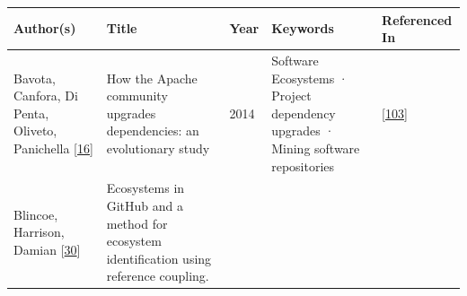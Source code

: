 \documentclass[]{book}
\begin{document}
\begin{longtable}[]{@{}lllll@{}}
\toprule
\begin{minipage}[b]{0.12\columnwidth}\raggedright\strut
Author(s)\strut
\end{minipage} & \begin{minipage}[b]{0.31\columnwidth}\raggedright\strut
Title\strut
\end{minipage} & \begin{minipage}[b]{0.02\columnwidth}\raggedright\strut
Year\strut
\end{minipage} & \begin{minipage}[b]{0.24\columnwidth}\raggedright\strut
Keywords\strut
\end{minipage} & \begin{minipage}[b]{0.16\columnwidth}\raggedright\strut
Referenced In\strut
\end{minipage}\tabularnewline
\midrule
\endhead
\begin{minipage}[t]{0.12\columnwidth}\raggedright\strut
Bavota, Canfora, Di Penta, Oliveto, Panichella
{[}\protect\hyperlink{ref-Bavota2014}{16}{]}\strut
\end{minipage} & \begin{minipage}[t]{0.31\columnwidth}\raggedright\strut
How the Apache community upgrades dependencies: an evolutionary
study\strut
\end{minipage} & \begin{minipage}[t]{0.02\columnwidth}\raggedright\strut
2014\strut
\end{minipage} & \begin{minipage}[t]{0.24\columnwidth}\raggedright\strut
Software Ecosystems · Project dependency upgrades · Mining software
repositories\strut
\end{minipage} & \begin{minipage}[t]{0.16\columnwidth}\raggedright\strut
{[}\protect\hyperlink{ref-Kula2017}{103}{]}\strut
\end{minipage}\tabularnewline
\begin{minipage}[t]{0.12\columnwidth}\raggedright\strut
Blincoe, Harrison, Damian
{[}\protect\hyperlink{ref-Blincoe2015}{30}{]}\strut
\end{minipage} & \begin{minipage}[t]{0.31\columnwidth}\raggedright\strut
Ecosystems in GitHub and a method for ecosystem identification using
reference coupling.\strut
\end{minipage} & \begin{minipage}[t]{0.02\columnwidth}\raggedright\strut

\end{minipage}
\end{longtable}
\end{document}

